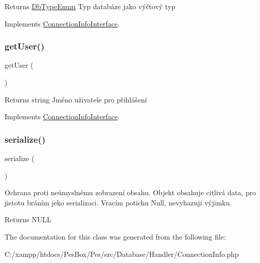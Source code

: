 \begin{DoxyReturn}{Returns}
\mbox{\hyperlink{class_pes_1_1_database_1_1_handler_1_1_db_type_enum}{Db\+Type\+Enum}} Typ databáze jako výčtový typ 
\end{DoxyReturn}


Implements \mbox{\hyperlink{interface_pes_1_1_database_1_1_handler_1_1_connection_info_interface_a36e6adfcbef4d922b36b8c6cea954c5c}{Connection\+Info\+Interface}}.

\mbox{\label{class_pes_1_1_database_1_1_handler_1_1_connection_info_ae81b7186fb97a7c6457edcc68c9aa2ef}} 
\subsubsection{\texorpdfstring{get\+User()}{getUser()}}
{\footnotesize\ttfamily get\+User (\begin{DoxyParamCaption}{ }\end{DoxyParamCaption})}

\begin{DoxyReturn}{Returns}
string Jméno uživatele pro přihlášení 
\end{DoxyReturn}


Implements \mbox{\hyperlink{interface_pes_1_1_database_1_1_handler_1_1_connection_info_interface_ae81b7186fb97a7c6457edcc68c9aa2ef}{Connection\+Info\+Interface}}.

\mbox{\label{class_pes_1_1_database_1_1_handler_1_1_connection_info_a4d9813fea8525b19a1d370eeb8fe41d6}} 
\subsubsection{\texorpdfstring{serialize()}{serialize()}}
{\footnotesize\ttfamily serialize (\begin{DoxyParamCaption}{ }\end{DoxyParamCaption})}

Ochrana proti neúmyslnému zobrazení obsahu. Objekt obsahuje citlivá data, pro jistotu bráním jeko serializaci. Vracím potichu Null, nevyhazuji výjimku. \begin{DoxyReturn}{Returns}
N\+U\+LL 
\end{DoxyReturn}


The documentation for this class was generated from the following file\+:\begin{DoxyCompactItemize}
\item 
C\+:/xampp/htdocs/\+Pes\+Box/\+Pes/src/\+Database/\+Handler/Connection\+Info.\+php\end{DoxyCompactItemize}

